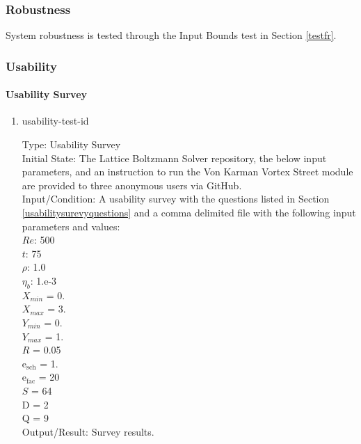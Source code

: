 \documentclass[12pt, titlepage]{article}
\newcommand{\famname}{Lattice Boltzmann Solver}
\newcounter{testcounter} %
\begin{document}
\subsubsection{Robustness}
		
System robustness is tested through the Input Bounds test in Section \ref{testfr}.

\subsubsection{Usability}

\paragraph{Usability Survey}

\begin{enumerate}

\item{usability-test-id\thetestcounter \\}

Type: Usability Survey\\
					
Initial State: The {\famname} repository, the below input parameters, and an instruction to run the Von Karman Vortex Street module are provided to three anonymous users via GitHub.\\
					
Input/Condition: A usability survey with the questions listed in Section \ref{usabilitysurevyquestions} and a comma delimited file with the following input parameters and values:\\
$Re$: 500\\
$t$: 75\\
$\rho$: 1.0\\
$\eta_b$: 1.e-3\\
$X_{min}$ = 0.\\
$X_{max}$ = 3.\\
$Y_{min}$ = 0.\\
$Y_{max}$ = 1.\\
$R$ = 0.05\\
$\mathrm{e_{sch}}$ = 1.\\
$\mathrm{e_{fac}}$ = 20\\
$S$ = 64\\
$\mathrm{D}$ = 2\\
$\mathrm{Q}$ = 9\\

				
Output/Result: Survey results.\\


\end{enumerate}
\end{document}
